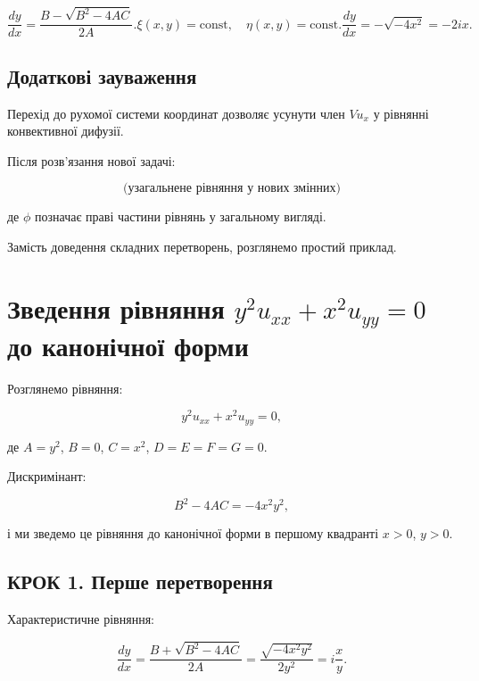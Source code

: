 \documentclass[
  ukrainian,
]{article}
\begin{document}
\[
\frac{dy}{dx} = \frac{B - \sqrt{B^2 - 4AC}}{2A}.
\xi(x, y) = \text{const}, \quad \eta(x, y) = \text{const}.
\frac{dy}{dx} = -\sqrt{-4x^2} = -2ix.
\]

\subsection{Додаткові
зауваження}\label{ux434ux43eux434ux430ux442ux43aux43eux432ux456-ux437ux430ux443ux432ux430ux436ux435ux43dux43dux44f}

Перехід до рухомої системи координат дозволяє усунути член \(V u_x\) у
рівнянні конвективної дифузії.

Після розв'язання нової задачі:

\[
\text{(узагальнене рівняння у нових змінних)}
\]

де \(\phi\) позначає праві частини рівнянь у загальному вигляді.

Замість доведення складних перетворень, розглянемо простий приклад.

\section{\texorpdfstring{Зведення рівняння
\(y^2 u_{xx} + x^2 u_{yy} = 0\) до канонічної
форми}{Зведення рівняння y\^{}2 u\_\{xx\} + x\^{}2 u\_\{yy\} = 0 до канонічної форми}}\label{ux437ux432ux435ux434ux435ux43dux43dux44f-ux440ux456ux432ux43dux44fux43dux43dux44f-y2-u_xx-x2-u_yy-0-ux434ux43e-ux43aux430ux43dux43eux43dux456ux447ux43dux43eux457-ux444ux43eux440ux43cux438}

Розглянемо рівняння:

\[
y^2 u_{xx} + x^2 u_{yy} = 0,
\]

де \(A = y^2\), \(B = 0\), \(C = x^2\), \(D = E = F = G = 0\).

Дискримінант:

\[
B^2 - 4AC = -4x^2 y^2,
\]

і ми зведемо це рівняння до канонічної форми в першому квадранті
\(x > 0\), \(y > 0\).

\subsection{КРОК 1. Перше
перетворення}\label{ux43aux440ux43eux43a-1.-ux43fux435ux440ux448ux435-ux43fux435ux440ux435ux442ux432ux43eux440ux435ux43dux43dux44f}

Характеристичне рівняння:

\[
\frac{dy}{dx} = \frac{B + \sqrt{B^2 - 4AC}}{2A} = \frac{\sqrt{-4x^2 y^2}}{2y^2} = i \frac{x}{y}.
\]
\end{document}
